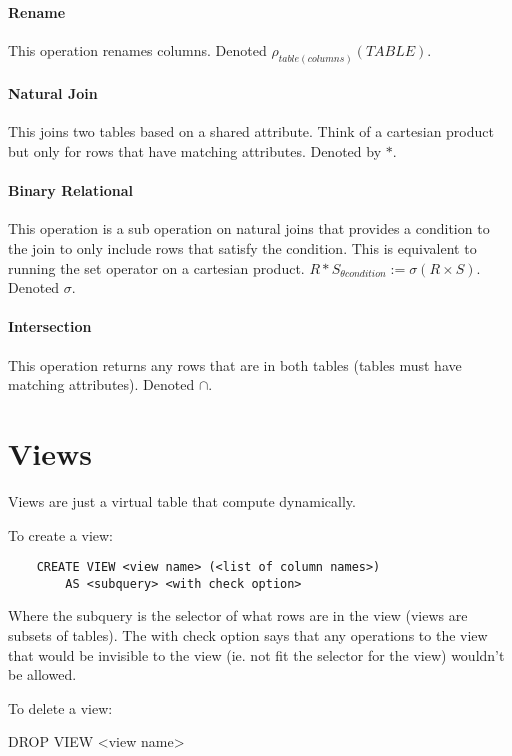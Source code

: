 \documentclass{article}
\begin{document}
\paragraph{Rename} %
\label{par:rename}
This operation renames columns. Denoted $\rho_{table(columns)}(TABLE)$.
\paragraph{Natural Join} %
\label{par:natural_join}
This joins two tables based on a shared attribute. Think of a cartesian product but only for rows that have matching attributes. Denoted by $*$.
\paragraph{Binary Relational} %
\label{par:binary_relational}
This operation is a sub operation on natural joins that provides a condition to the join to only include rows that satisfy the condition. This is equivalent to running the set operator on a cartesian product. $R*S_{\theta condition} := \sigma(R\times S)$. Denoted $\sigma$.
\paragraph{Intersection} %
\label{par:intersection}
This operation returns any rows that are in both tables (tables must have matching attributes). Denoted $\cap$.

\section{Views} %
\label{sec:views}
Views are just a virtual table that compute dynamically.

To create a view:
\begin{verbatim}
    CREATE VIEW <view name> (<list of column names>)
        AS <subquery> <with check option>
\end{verbatim}
Where the subquery is the selector of what rows are in the view (views are subsets of tables). The with check option says that any operations to the view that would be invisible to the view (ie. not fit the selector for the view) wouldn't be allowed.

To delete a view:
\begin{verbatime}
    DROP VIEW <view name>
\end{verbatime}
\end{document}
